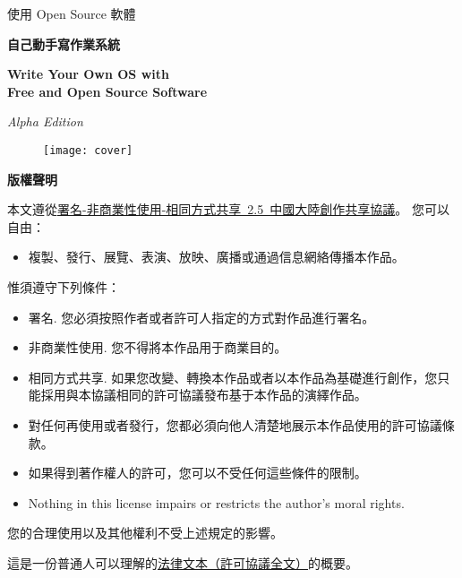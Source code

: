 \begin{center}
\Huge 使用 Open Source 軟體

\bf\fontsize{48}{52}\selectfont 自己動手寫作業系統

\bf\sc\Huge Write Your Own OS with\\ Free and Open Source Software

\it\LARGE Alpha Edition
\end{center}

\vskip 1cm
\begin{figure}[htbp]
 \centering
\texttt{[image: cover]}
\end{figure}

\noindent{}
\noindent{}
\clearpage

\begin{lined}{\textwidth}\vspace{2ex}
\begin{center}
\bf\Large 版權聲明
\end{center}
\vspace{2ex}
\end{lined}

\normalsize
本文遵從\href{http://creativecommons.org/licenses/by-nc-sa/2.5/cn/}{署名-非商業性使用-相同方式共享~2.5~中國大陸創作共享協議}。
\vskip 1cm
\noindent
\large 您可以自由：
\normalsize
\begin{itemize}
\item 複製、發行、展覽、表演、放映、廣播或通過信息網絡傳播本作品。
\end{itemize}

\noindent
\large 惟須遵守下列條件：
\normalsize
\begin{itemize}
\item{署名.} 您必須按照作者或者許可人指定的方式對作品進行署名。
\item{非商業性使用.} 您不得將本作品用于商業目的。
\item{相同方式共享.} 如果您改變、轉換本作品或者以本作品為基礎進行創作，您只能採用與本協議相同的許可協議發布基于本作品的演繹作品。
\item 對任何再使用或者發行，您都必須向他人清楚地展示本作品使用的許可協議條款。
\item 如果得到著作權人的許可，您可以不受任何這些條件的限制。
\item Nothing in this license impairs or restricts the author's moral rights.
\end{itemize}
\vskip 1cm
\normalsize
\begin{center}
您的合理使用以及其他權利不受上述規定的影響。

這是一份普通人可以理解的\href{http://creativecommons.org/licenses/by-nc-sa/2.5/cn/legalcode}{法律文本（許可協議全文）}的概要。 
\end{center}

